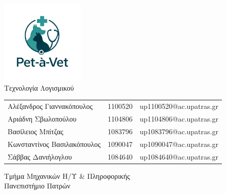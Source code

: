 \documentclass[12pt,a4paper,twoside]{book}
\begin{document}
\let\cleardoublepage\clearpage


\begin{titlepage}
  \vspace*{5cm}
  \begin{center}
    \includegraphics[width=0.3\textwidth]{Resources/Pet-a-vet-logo-transparent.png}\\
    \vspace*{0.5cm}
    {\large Τεχνολογία Λογισμικού}
    \vspace*{5cm}
    \\
    \vspace*{1cm}
    \begin{tabular}{l l l}
      \large Αλέξανδρος Γιαννακόπουλος   & \large 1100520 & \large up1100520@ac.upatras.gr \\ %
      \large Αριάδνη Σβωλοπούλου         & \large 1104806 & \large up1104806@ac.upatras.gr \\ %
      \large Βασίλειος Μπίτζας           & \large 1083796 & \large up1083796@ac.upatras.gr \\
      \large Κωνσταντίνος Βασιλακόπουλος & \large 1090047 & \large up1090047@ac.upatras.gr \\
      \large Σάββας Δανιήλογλου          & \large 1084640 & \large up1084640@ac.upatras.gr
    \end{tabular}

    \vspace*{1cm}

    {\normalsize Τμήμα Μηχανικών Η/Υ \& Πληροφορικής}
    \\
    {\normalsize Πανεπιστήμιο Πατρών}
    \\
  \end{center}
  \thispagestyle{empty} %
\end{titlepage}
\end{document}
